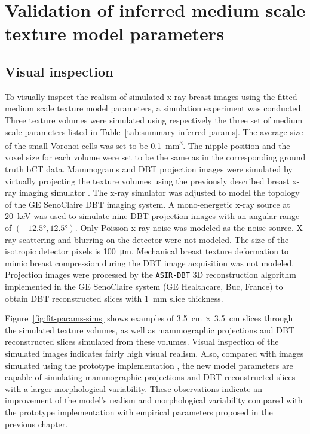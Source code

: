 \documentclass[journal]{IEEEtran}
\begin{document}
\section{Validation of inferred medium scale texture model parameters}
\label{sec:valid-inferr-medi}

\subsection{Visual inspection}
\label{sec:visual-validation-1}

To visually inspect the realism of simulated x-ray breast images using
the fitted medium scale texture model parameters, a simulation
experiment was conducted. Three texture volumes were simulated using
respectively the three set of medium scale parameters listed in
Table~\ref{tab:summary-inferred-params}. The average size of the small
Voronoi cells was set to be \SI{0.1}{\mm\cubed}. The nipple position
and the voxel size for each volume were set to be the same as in the
corresponding ground truth bCT data. Mammograms and DBT projection
images were simulated by virtually projecting the texture volumes
using the previously described breast x-ray imaging simulator
\cite{milioni2014low}. The x-ray simulator was adjusted to model the
topology of the GE SenoClaire DBT imaging system. A mono-energetic
x-ray source at \SI{20}{\keV} was used to simulate nine DBT projection
images with an angular range of $( \ang{-12.5}, \ang{12.5} )$. Only
Poisson x-ray noise was modeled as the noise source. X-ray scattering
and blurring on the detector were not modeled. The size of the
isotropic detector pixels is \SI{100}{\um}. Mechanical breast texture
deformation to mimic breast compression during the DBT image
acquisition was not modeled. Projection images were processed by the
\texttt{ASIR-DBT} 3D reconstruction algorithm implemented in the GE
SenoClaire system (GE Healthcare, Buc, France) to obtain DBT
reconstructed slices with \SI{1}{\mm} slice thickness.

Figure~\ref{fig:fit-params-sims} shows examples of \SI{3.5}{\cm}
$\times$ \SI{3.5}{\cm} slices through the simulated texture volumes,
as well as mammographic projections and DBT reconstructed slices
simulated from these volumes. Visual inspection of the simulated
images indicates fairly high visual realism. Also, compared with
images simulated using the prototype implementation
\cite{li2016novel}, the new model parameters are capable of simulating
mammographic projections and DBT reconstructed slices with a larger
morphological variability. These observations indicate an improvement
of the model's realism and morphological variability compared with the
prototype implementation with empirical parameters proposed in the
previous chapter.
\end{document}
